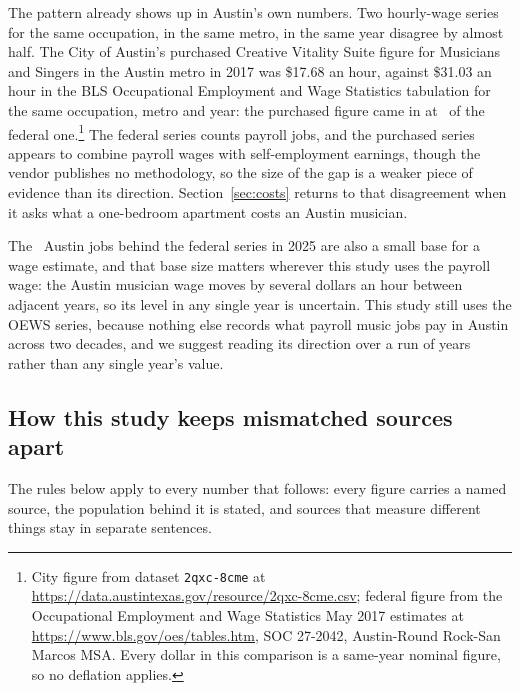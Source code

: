The pattern already shows up in Austin's own numbers. Two hourly-wage series
for the same occupation, in the same metro, in the same year disagree by
almost half. The City of Austin's purchased Creative Vitality Suite figure for
Musicians and Singers in the Austin metro in 2017 was \$17.68 an hour, against
\$31.03 an hour in the BLS Occupational Employment and Wage Statistics
tabulation for the same occupation, metro and year: the purchased figure came
in at \NColAnchorCityWageVsOewsTwoZeroOneSeven\ of the federal
one.\footnote{City figure from dataset \texttt{2qxc-8cme} at
\url{https://data.austintexas.gov/resource/2qxc-8cme.csv}; federal figure from
the Occupational Employment and Wage Statistics May 2017 estimates at
\url{https://www.bls.gov/oes/tables.htm}, SOC 27-2042, Austin-Round
Rock-San Marcos MSA. Every dollar in this comparison is a same-year nominal
figure, so no deflation applies.} The federal series counts payroll jobs, and
the purchased series appears to combine payroll wages with self-employment
earnings, though the vendor publishes no methodology, so the size of the gap
is a weaker piece of evidence than its direction. Section~\ref{sec:costs}
returns to that disagreement when it asks what a one-bedroom apartment costs
an Austin musician.

The \NEmpPayrollMusiciansAustinLast\ Austin jobs behind the federal series in
2025 are also a small base for a wage estimate, and that base size matters
wherever this study uses the payroll wage: the Austin musician wage moves by
several dollars an hour between adjacent years, so its level in any single
year is uncertain. This study still uses the OEWS series, because nothing else
records what payroll music jobs pay in Austin across two decades, and we
suggest reading its direction over a run of years rather than any single
year's value.

\subsection{How this study keeps mismatched sources apart}

The rules below apply to every number that follows: every figure carries a
named source, the population behind it is stated, and sources that measure
different things stay in separate sentences.

